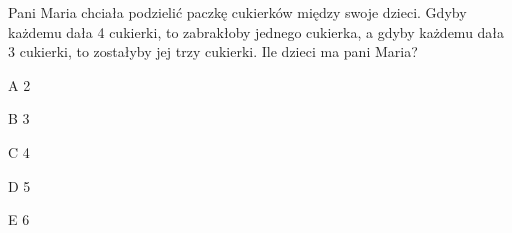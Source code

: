 \begin{tresc}
Pani Maria chciała podzielić paczkę cukierków między swoje dzieci. Gdyby każdemu dała 4 cukierki, to zabrakłoby jednego cukierka, a gdyby każdemu dała 3 cukierki, to zostałyby jej trzy cukierki. Ile dzieci ma pani Maria?
\end{tresc}
\begin{wariant}{A} 2 \end{wariant}
\begin{wariant}{B} 3 \end{wariant}
\begin{wariant}{C} 4 \end{wariant}
\begin{wariant}{D} 5 \end{wariant}
\begin{wariant}{E} 6 \end{wariant}
